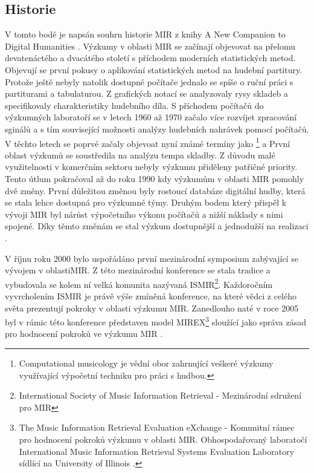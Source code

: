     \subsection{Historie}
    V tomto bodě je napsán souhrn historie MIR z knihy A New Companion to Digital Humanities \cite{a_new_companion_to_digital_humanities}.
    Výzkumy v oblasti \acs{MIR} se začínají objevovat na přelomu devatenáctého a dvacátého století s příchodem moderních statistických metod.
    Objevují se první pokusy o aplikování statistických metod na hudební partitury.
    Protože ještě nebyly natolik dostupné počítače jednalo se spíše o ruční práci s partiturami a tabulaturou.
    Z grafických notací se analyzovaly rysy skladeb a specifikovaly charakteristiky hudebního díla.
    S příchodem počítačů do výzkumných laboratoří se v letech 1960 až 1970 začalo více rozvíjet zpracování sginálů a s tím související možnosti analýzy hudebních nahrávek pomocí počítačů.
    V těchto letech se poprvé začaly objevoat nyní známé termíny jako \footnote{Computational musicology je vědní obor zahrnující veškeré výzkumy využívající výpočetní techniku pro práci s hudbou. } a 
    První oblast výzkumů se soustředila na analýzu tempa skladby. Z důvodu malé využitelnosti v komerčním sektoru nebyly výzkumu přiděleny patřičné priority.
    Tento útlum pokračoval až do roku 1990 kdy výzkumům v oblasti \acs{MIR} pomohly dvě změny.
    První důležitou změnou byly rostoucí databáze digitální hudby, která se stala lehce dostupná pro výzkumné týmy.
    Druhým bodem který přispěl k vývoji \acs{MIR} byl nárůst výpočetního výkonu počítačů a nižší náklady s nimi spojené.
    Díky těmto změnám se stal výzkum dostupnější a jednodužší na realizaci \cite{a_new_companion_to_digital_humanities}.

    V říjnu roku 2000 bylo uspořádáno první mezinárodní symposium zabývající se vývojem v oblasti\acs{MIR}.
    Z této mezinárodní konference se stala tradice a vybudovala se kolem ní velká komunita nazývaná \acs{ISMIR}\footnote{International Society of Music Information Retrieval - Mezinárodní sdružení pro \acs{MIR}}.
    Každoročním vyvrcholením \acs{ISMIR} je právě výše zmíněná konference, na které vědci z celého světa prezentují pokroky v oblasti výzkumu \acs{MIR}.
    Zanedlouho naté v roce 2005 byl v rámic této konference představen model \acs{MIREX}\footnote{The Music Information Retrieval Evaluation eXchange - Komunitní rámec pro hodnocení pokroků výzkumu v oblasti \acs{MIR}.
    Obhospodařovaný laboratočí International Music Information Retrieval Systems Evaluation Laboratory sídlící na University of Illinois \cite{Downie2010}.}
    sloužící jako správa zásad pro hodnocení pokroků ve výzkumu \acs{MIR} \cite{Downie2010}.
    
